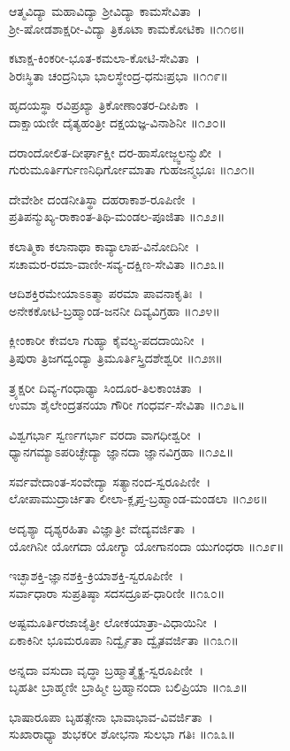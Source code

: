 ಆತ್ಮವಿದ್ಯಾ ಮಹಾವಿದ್ಯಾ ಶ್ರೀವಿದ್ಯಾ ಕಾಮಸೇವಿತಾ~।\\
ಶ್ರೀ-ಷೋಡಶಾಕ್ಷರೀ-ವಿದ್ಯಾ ತ್ರಿಕೂಟಾ ಕಾಮಕೋಟಿಕಾ ॥೧೧೮॥

ಕಟಾಕ್ಷ-ಕಿಂಕರೀ-ಭೂತ-ಕಮಲಾ-ಕೋಟಿ-ಸೇವಿತಾ~।\\
ಶಿರಃಸ್ಥಿತಾ ಚಂದ್ರನಿಭಾ ಭಾಲಸ್ಥೇಂದ್ರ-ಧನುಃಪ್ರಭಾ ॥೧೧೯॥

ಹೃದಯಸ್ಥಾ ರವಿಪ್ರಖ್ಯಾ ತ್ರಿಕೋಣಾಂತರ-ದೀಪಿಕಾ~।\\
ದಾಕ್ಷಾಯಣೀ ದೈತ್ಯಹಂತ್ರೀ ದಕ್ಷಯಜ್ಞ-ವಿನಾಶಿನೀ  ॥೧೨೦॥

ದರಾಂದೋಲಿತ-ದೀರ್ಘಾಕ್ಷೀ ದರ-ಹಾಸೋಜ್ಜ್ವಲನ್ಮುಖೀ~।\\
ಗುರುಮೂರ್ತಿರ್ಗುಣನಿಧಿರ್ಗೋಮಾತಾ ಗುಹಜನ್ಮಭೂಃ ॥೧೨೧॥

ದೇವೇಶೀ ದಂಡನೀತಿಸ್ಥಾ ದಹರಾಕಾಶ-ರೂಪಿಣೀ~।\\
ಪ್ರತಿಪನ್ಮುಖ್ಯ-ರಾಕಾಂತ-ತಿಥಿ-ಮಂಡಲ-ಪೂಜಿತಾ ॥೧೨೨॥

ಕಲಾತ್ಮಿಕಾ ಕಲಾನಾಥಾ ಕಾವ್ಯಾಲಾಪ-ವಿನೋದಿನೀ~।\\
ಸಚಾಮರ-ರಮಾ-ವಾಣೀ-ಸವ್ಯ-ದಕ್ಷಿಣ-ಸೇವಿತಾ ॥೧೨೩॥

ಆದಿಶಕ್ತಿರಮೇಯಾಽಽತ್ಮಾ ಪರಮಾ ಪಾವನಾಕೃತಿಃ~।\\
ಅನೇಕಕೋಟಿ-ಬ್ರಹ್ಮಾಂಡ-ಜನನೀ ದಿವ್ಯವಿಗ್ರಹಾ ॥೧೨೪॥

ಕ್ಲೀಂಕಾರೀ ಕೇವಲಾ ಗುಹ್ಯಾ ಕೈವಲ್ಯ-ಪದದಾಯಿನೀ~।\\
ತ್ರಿಪುರಾ ತ್ರಿಜಗದ್ವಂದ್ಯಾ ತ್ರಿಮೂರ್ತಿಸ್ತ್ರಿದಶೇಶ್ವರೀ ॥೧೨೫॥

ತ್ರ್ಯಕ್ಷರೀ ದಿವ್ಯ-ಗಂಧಾಢ್ಯಾ ಸಿಂದೂರ-ತಿಲಕಾಂಚಿತಾ~।\\
ಉಮಾ ಶೈಲೇಂದ್ರತನಯಾ ಗೌರೀ ಗಂಧರ್ವ-ಸೇವಿತಾ ॥೧೨೬॥

ವಿಶ್ವಗರ್ಭಾ ಸ್ವರ್ಣಗರ್ಭಾ ವರದಾ ವಾಗಧೀಶ್ವರೀ~।\\
ಧ್ಯಾನಗಮ್ಯಾಽಪರಿಚ್ಛೇದ್ಯಾ ಜ್ಞಾನದಾ ಜ್ಞಾನವಿಗ್ರಹಾ ॥೧೨೭॥

ಸರ್ವವೇದಾಂತ-ಸಂವೇದ್ಯಾ ಸತ್ಯಾನಂದ-ಸ್ವರೂಪಿಣೀ~।\\
ಲೋಪಾಮುದ್ರಾರ್ಚಿತಾ ಲೀಲಾ-ಕ್ಲೃಪ್ತ-ಬ್ರಹ್ಮಾಂಡ-ಮಂಡಲಾ ॥೧೨೮॥

ಅದೃಶ್ಯಾ ದೃಶ್ಯರಹಿತಾ ವಿಜ್ಞಾತ್ರೀ ವೇದ್ಯವರ್ಜಿತಾ~।\\
ಯೋಗಿನೀ ಯೋಗದಾ ಯೋಗ್ಯಾ ಯೋಗಾನಂದಾ ಯುಗಂಧರಾ ॥೧೨೯॥

ಇಚ್ಛಾಶಕ್ತಿ-ಜ್ಞಾನಶಕ್ತಿ-ಕ್ರಿಯಾಶಕ್ತಿ-ಸ್ವರೂಪಿಣೀ~।\\
ಸರ್ವಾಧಾರಾ ಸುಪ್ರತಿಷ್ಠಾ ಸದಸದ್ರೂಪ-ಧಾರಿಣೀ ॥೧೩೦॥

ಅಷ್ಟಮೂರ್ತಿರಜಾಜೈತ್ರೀ ಲೋಕಯಾತ್ರಾ-ವಿಧಾಯಿನೀ~।\\
ಏಕಾಕಿನೀ ಭೂಮರೂಪಾ ನಿರ್ದ್ವೈತಾ ದ್ವೈತವರ್ಜಿತಾ ॥೧೩೧॥

ಅನ್ನದಾ ವಸುದಾ ವೃದ್ಧಾ ಬ್ರಹ್ಮಾತ್ಮೈಕ್ಯ-ಸ್ವರೂಪಿಣೀ~।\\
ಬೃಹತೀ ಬ್ರಾಹ್ಮಣೀ ಬ್ರಾಹ್ಮೀ ಬ್ರಹ್ಮಾನಂದಾ ಬಲಿಪ್ರಿಯಾ ॥೧೩೨॥

ಭಾಷಾರೂಪಾ ಬೃಹತ್ಸೇನಾ ಭಾವಾಭಾವ-ವಿವರ್ಜಿತಾ~।\\
ಸುಖಾರಾಧ್ಯಾ ಶುಭಕರೀ ಶೋಭನಾ ಸುಲಭಾ ಗತಿಃ ॥೧೩೩॥

